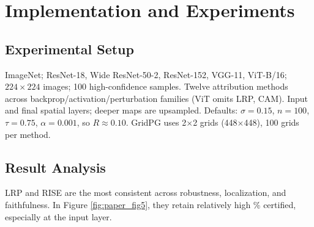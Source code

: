 \documentclass[11pt]{article}
\begin{document}



\section{Implementation and Experiments}

\subsection{Experimental Setup}
ImageNet; ResNet-18, Wide ResNet-50-2, ResNet-152, VGG-11, ViT-B/16; $224\times224$ images; 100 high-confidence samples. Twelve attribution methods across backprop/activation/perturbation families (ViT omits LRP, CAM). Input and final spatial layers; deeper maps are upsampled. Defaults: $\sigma=0.15$, $n=100$, $\tau=0.75$, $\alpha=0.001$, so $R\approx0.10$. GridPG uses 2$\times$2 grids (448$\times$448), 100 grids per method.

\subsection{Result Analysis}
LRP and RISE are the most consistent across robustness, localization, and faithfulness. In Figure \ref{fig:paper_fig5}, they retain relatively high \% certified, especially at the input layer.
\end{document}
